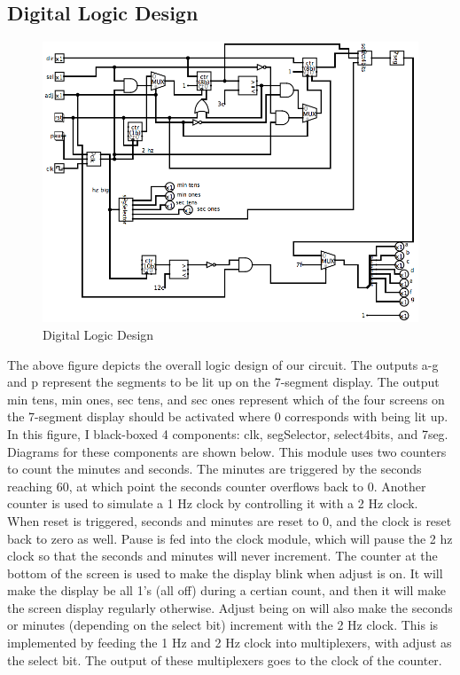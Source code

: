 \documentclass{article}
\begin{document}
\subsection*{Digital Logic Design}
\begin{figure}[H]
	\begin{center}
		\includegraphics[width=1\textwidth]{main.png} 
		\caption{Digital Logic Design}
	\end{center}
\end{figure}

The above figure depicts the overall logic design of our circuit. The outputs a-g and p represent the segments to be lit up on the 7-segment display. The output min tens, min ones, sec tens, and sec ones represent which of the four screens on the 7-segment display should be activated where 0 corresponds with being lit up. In this figure, I black-boxed 4 components: clk, segSelector, select4bits, and 7seg. Diagrams for these components are shown below. This module uses two counters to count the minutes and seconds. The minutes are triggered by the seconds reaching 60, at which point the seconds counter overflows back to 0. Another counter is used to simulate a 1 Hz clock by controlling it with a 2 Hz clock. When reset is triggered, seconds and minutes are reset to 0, and the clock is reset back to zero as well. Pause is fed into the clock module, which will pause the 2 hz clock so that the seconds and minutes will never increment. The counter at the bottom of the screen is used to make the display blink when adjust is on. It will make the display be all 1's (all off) during a certian count, and then it will make the screen display regularly otherwise. Adjust being on will also make the seconds or minutes (depending on the select bit) increment with the 2 Hz clock. This is implemented by feeding the 1 Hz and 2 Hz clock into multiplexers, with adjust as the select bit. The output of these multiplexers goes to the clock of the counter.
\end{document}
